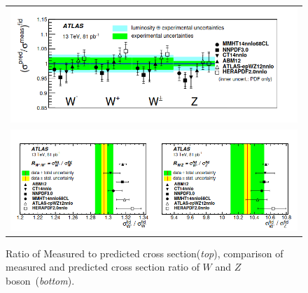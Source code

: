 \begin{figure}[H]
\centering
\begin{tabular}{c}
\includegraphics[scale=0.57]{chapter3/atlas13.png}\\
\includegraphics[scale=0.5]{chapter3/atlas13-1.png}
\end{tabular}
\caption{Ratio of Measured to predicted cross section(\textit{top}), comparison of measured and predicted cross section ratio of $W$ and $Z$ boson~(\textit{bottom}).~\cite{Aad_2016} }
\label{ratio-13tev}
\end{figure}



